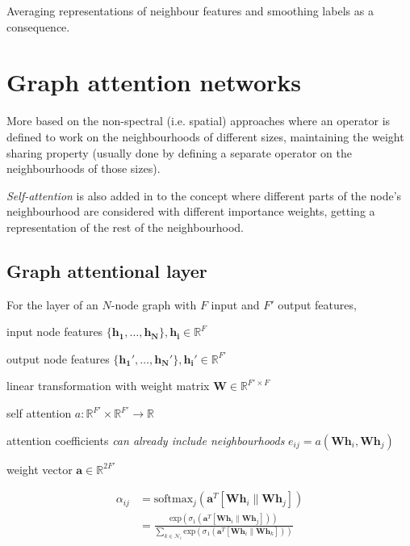 Averaging representations of neighbour features and smoothing labels as a consequence. \cite{wu2019simplifying}



\section{Graph attention networks}
\label{training-gat}
\cite{velickovic2018graph} More based on the non-spectral (i.e. spatial) approaches where an operator is defined to work on the neighbourhoods of different sizes, maintaining the weight sharing property (usually done by defining a separate operator on the neighbourhoods of those sizes).


\textit{Self-attention} is also added in to the concept where different parts of the node's neighbourhood are considered with different importance weights, getting a representation of the rest of the neighbourhood. 


\subsection{Graph attentional layer}
For the layer of an $N$-node graph with $F$ input and $F'$ output features, 

input node features $\{\mathbf{h_1}, \dots, \mathbf{h_N}\}, \mathbf{h_i} \in \mathbb{R}^F$

output node features $\{\mathbf{h_1'}, \dots, \mathbf{h_N'}\}, \mathbf{h_i'} \in \mathbb{R}^{F'}$

linear transformation with weight matrix $\mathbf{W} \in \mathbb{R}^{F' \times F}$

self attention $a: \mathbb{R}^{F'} \times \mathbb{R}^{F'} \rightarrow \mathbb{R}$

attention coefficients \textit{can already include neighbourhoods} $e_{ij} = a(\mathbf{W}\mathbf{h}_i, \mathbf{W}\mathbf{h}_j)$



weight vector $\mathbf{a} \in \mathbb{R}^{2F'}$

\begin{align}
    \alpha_{ij} &= \mathrm{softmax}_j(\mathbf{a}^T[\mathbf{W}\mathbf{h}_i \parallel \mathbf{W}\mathbf{h}_j]) \\
    &=  \frac{\mathrm{exp}(\sigma_1(\mathbf{a}^T[\mathbf{W}\mathbf{h}_i \parallel \mathbf{W}\mathbf{h}_j]))}{\sum\limits_{k \in \mathcal{N}_i}\mathrm{exp}(\sigma_1(\mathbf{a}^T[\mathbf{W}\mathbf{h}_i \parallel \mathbf{W}\mathbf{h}_k]))}
\end{align}

